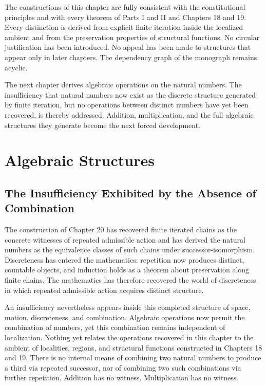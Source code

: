 \documentclass[12pt,anyside]{book}
\begin{document}
\begin{consistencyaudit}
The constructions of this chapter are fully consistent with the constitutional principles and with every theorem of Parts I and II and Chapters 18 and 19. Every distinction is derived from explicit finite iteration inside the localized ambient and from the preservation properties of structural functions. No circular justification has been introduced. No appeal has been made to structures that appear only in later chapters. The dependency graph of the monograph remains acyclic.
\end{consistencyaudit}

\begin{futurework}
The next chapter derives algebraic operations on the natural numbers. The insufficiency that natural numbers now exist as the discrete structure generated by finite iteration, but no operations between distinct numbers have yet been recovered, is thereby addressed. Addition, multiplication, and the full algebraic structures they generate become the next forced development.
\end{futurework}

\chapter{Algebraic Structures}

\section{The Insufficiency Exhibited by the Absence of Combination}
The construction of Chapter 20 has recovered finite iterated chains as the concrete witnesses of repeated admissible action and has derived the natural numbers as the equivalence classes of such chains under successor-isomorphism. Discreteness has entered the mathematics: repetition now produces distinct, countable objects, and induction holds as a theorem about preservation along finite chains. The mathematics has therefore recovered the world of discreteness in which repeated admissible action acquires distinct structure.

An insufficiency nevertheless appears inside this completed structure of space, motion, discreteness, and combination. Algebraic operations now permit the combination of numbers, yet this combination remains independent of localization. Nothing yet relates the operations recovered in this chapter to the ambient of localities, regions, and structural functions constructed in Chapters 18 and 19. There is no internal means of combining two natural numbers to produce a third via repeated successor, nor of combining two such combinations via further repetition. Addition has no witness. Multiplication has no witness. 
\end{document}
